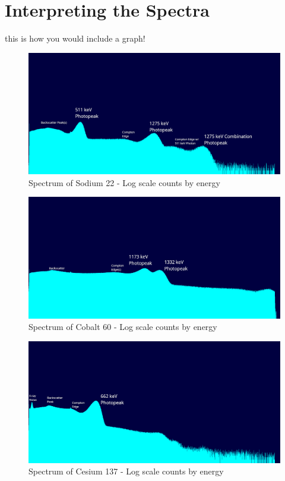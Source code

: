 \documentclass[12pt, a4paper]{article}
\begin{document}
\section{Interpreting the Spectra}
	this is how you would include a graph!
	\begin{figure}[H] \centering
		\includegraphics[scale=0.3]{assets/na22_log_annotated.png}
		\caption{Spectrum of Sodium 22 - Log scale counts by energy}
	\end{figure}
	\begin{figure}[H] \centering
		\includegraphics[scale=0.3]{assets/co60_log_annotated.png}
		\caption{Spectrum of Cobalt 60 - Log scale counts by energy}
	\end{figure}
	\begin{figure}[H] \centering
		\includegraphics[scale=0.3]{assets/cs137_log_annotated.png}
		\caption{Spectrum of Cesium 137 - Log scale counts by energy}
	\end{figure}
\end{document}
